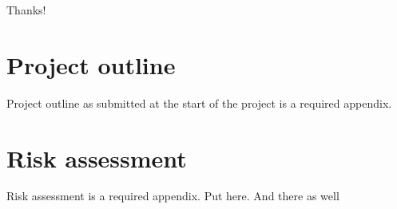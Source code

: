 
\makeatletter
\title{\xmp@Title}
\studentid{\xmp@Author}
\makeatother

\maketitle



\uomtoc


\begin{abstract} %
  This is abstract text.

  \lipsum[1-2]
\end{abstract}%
\clearpage


\uomdeclarations %


\begin{uomacknowledgements}
  Thanks!
\end{uomacknowledgements}





\printbibliography[title={References},heading=bibintoc]


\newpage
\printglossary[type=\acronymtype]

\begin{uomappendix}
    \section{Project outline}
    Project outline as submitted at the start of the project is a required appendix.

    \section{Risk assessment}
    Risk assessment is a required appendix. Put here. And there as well
\end{uomappendix}


